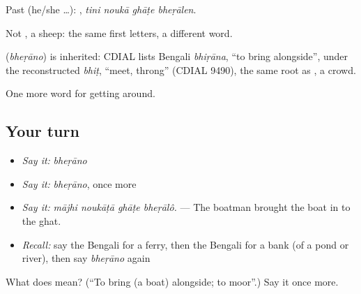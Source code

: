 Past (he/she …):    , \emph{tini noukā ghāṭe bheṛālen}.

Not , a sheep: the same first letters, a different word.

\begin{cousinweb}
\textbf{} (\emph{bheṛāno}) is inherited: CDIAL lists Bengali \emph{bhiṛāna}, \textquotedblleft{}to bring alongside\textquotedblright{}, under the reconstructed \emph{bhiṭ}, \textquotedblleft{}meet, throng\textquotedblright{} (CDIAL 9490), the same root as , a crowd.
\end{cousinweb}

\begin{grammarlens}[title={What you've built}]
One more word for getting around.
\end{grammarlens}

\subsection*{Your turn}
\begin{itemize}
\raggedright
  \item \emph{Say it:} \emph{bheṛāno}
  \item \emph{Say it:} \emph{bheṛāno}, once more
  \item \emph{Say it:} \emph{mājhi noukāṭā ghāṭe bheṛālô.} — The boatman brought the boat in to the ghat.
  \item \emph{Recall:} say the Bengali for a ferry, then the Bengali for a bank (of a pond or river), then say \emph{bheṛāno} again
\end{itemize}

\begin{tcolorbox}[breakable,colback=teal!4,colframe=teal!35!black,title={Before you move on}]
What does  mean? (\textquotedblleft{}To bring (a boat) alongside; to moor\textquotedblright{}.) Say it once more.
\end{tcolorbox}
